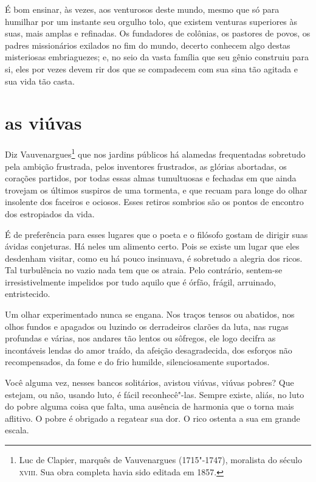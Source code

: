 \quebra
É bom ensinar, às vezes, aos venturosos deste mundo, mesmo que só para
humilhar por um instante seu orgulho tolo, que existem venturas
superiores às suas, mais amplas e refinadas. Os fundadores de colônias,
os pastores de povos, os padres missionários exilados no fim do mundo,
decerto conhecem algo destas misteriosas embriaguezes; e, no seio da
vasta família que seu gênio construiu para si, eles por vezes devem rir
dos que se compadecem com sua sina tão agitada e sua vida tão
casta.

\quebra\section[As viúvas]{as viúvas}

Diz Vauvenargues\protect\footnote{
 Luc de Clapier, marquês de Vauvenargues (1715"-1747), moralista do
século \textsc{xviii}. Sua obra completa havia sido editada em 1857.}
 que nos jardins públicos há
alamedas frequentadas sobretudo pela ambição frustrada, pelos
inventores frustrados, as glórias abortadas, os corações partidos,
por todas essas almas tumultuosas e fechadas em que ainda trovejam
os últimos suspiros de uma tormenta, e que recuam para longe do olhar
insolente dos faceiros e ociosos. Esses retiros sombrios são os
pontos de encontro dos estropiados da vida.

É de preferência para esses lugares que o poeta e o filósofo gostam de
dirigir suas ávidas conjeturas. Há neles um alimento certo. Pois se
existe um lugar que eles desdenham visitar, como eu há pouco insinuava,
é sobretudo a alegria dos ricos. Tal turbulência no vazio nada tem que
os atraia. Pelo contrário, sentem-se irresistivelmente impelidos
por tudo aquilo que é órfão, frágil, arruinado, entristecido.

Um olhar experimentado nunca se engana. Nos traços tensos ou
abatidos, nos olhos fundos e apagados ou luzindo os derradeiros clarões
da luta, nas rugas profundas e várias, nos andares tão
lentos ou sôfregos, ele logo decifra as incontáveis lendas do amor
traído, da afeição desagradecida, dos esforços não recompensados, da
fome e do frio humilde, silenciosamente suportados.

Você alguma vez, nesses bancos solitários, avistou viúvas, viúvas
pobres? Que estejam, ou não, usando luto, é fácil reconhecê"-las. Sempre existe, aliás, no luto do pobre alguma coisa que falta, uma ausência de
harmonia que o torna mais aflitivo. O pobre é obrigado a regatear sua dor. O
rico ostenta a sua em grande escala.

